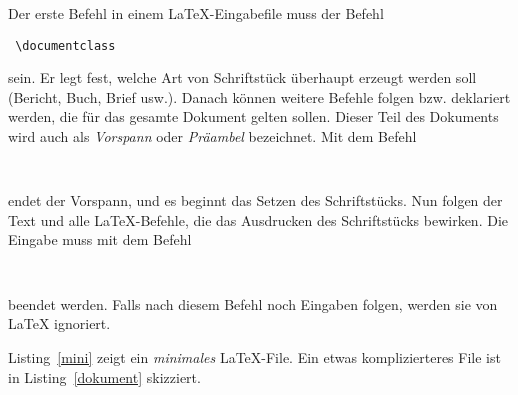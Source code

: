 Der erste Befehl in einem \LaTeX-Eingabefile muss der Befehl
\begin{lstlisting}
 \documentclass
\end{lstlisting}
sein. Er legt fest, welche Art von Schriftstück überhaupt erzeugt werden soll
(Bericht, Buch, Brief usw.). Danach können weitere Befehle folgen bzw.
deklariert werden, die für das gesamte Dokument gelten sollen.  Dieser Teil des
Dokuments wird auch als \emph{Vorspann} oder \emph{Präambel} bezeichnet. Mit dem
Befehl
\begin{lstlisting}
 
\end{lstlisting}
endet der Vorspann, und es beginnt das Setzen des Schriftstücks. Nun folgen der
Text und alle \LaTeX-Befehle, die das Ausdrucken des Schriftstücks bewirken.
Die Eingabe muss mit dem Befehl
\begin{lstlisting}
 
\end{lstlisting}
beendet werden. Falls nach diesem Befehl noch Eingaben folgen, werden sie von
\LaTeX{} ignoriert.

Listing~\ref{mini} zeigt ein \emph{minimales} \LaTeX-File. Ein etwas
komplizierteres File ist in Listing~\ref{dokument} skizziert.




